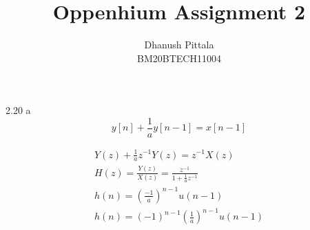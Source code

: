 \documentclass[12pt]{article}
\begin{document}
	
	
	
	\title{Oppenhium Assignment 2}
	\author{Dhanush Pittala\\BM20BTECH11004}
	\maketitle
	
	2.20
	a
	\begin{equation}
	y[n]+ \frac{1}{a} y[n-1]= x[n-1]
	\end{equation}

    \begin{align}
	Y(z) + \frac{1}{a} z^{-1} Y(z) = z^{-1} X(z) 
	\\
	H(z)= \frac{Y(z)}{X(z)} = \frac{z^{-1}}{1+ \frac{1}{a} z^{-1}}
	\\
	   h(n) = ({\frac{-1}{a}})^{n-1} u(n-1)
	 \\
	    h(n)= ({-1})^{n-1} ({\frac{1}{a}})^{n-1} u(n-1)
	\end{align}

	
	
\end{document}
